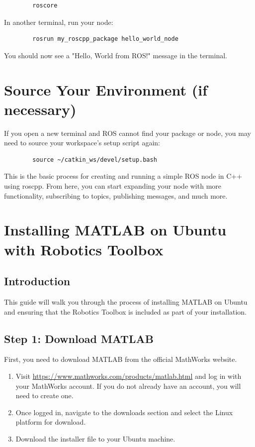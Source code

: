\documentclass[12pt,a4paper]{article}
\begin{document}
	\begin{verbatim}
		roscore
	\end{verbatim}
	In another terminal, run your node:
	
	\begin{verbatim}
		rosrun my_roscpp_package hello_world_node
	\end{verbatim}
	You should now see a "Hello, World from ROS!" message in the terminal.
	
	\section{Source Your Environment (if necessary)}
	If you open a new terminal and ROS cannot find your package or node, you may need to source your workspace's setup script again:
	
	\begin{verbatim}
		source ~/catkin_ws/devel/setup.bash
	\end{verbatim}
	This is the basic process for creating and running a simple ROS node in C++ using roscpp. From here, you can start expanding your node with more functionality, subscribing to topics, publishing messages, and much more.
	
	\section{Installing MATLAB on Ubuntu with Robotics Toolbox}
	\subsection{Introduction}
	This guide will walk you through the process of installing MATLAB on Ubuntu and ensuring that the Robotics Toolbox is included as part of your installation.
	
	\subsection{Step 1: Download MATLAB}
	First, you need to download MATLAB from the official MathWorks website.
	\begin{enumerate}
		\item Visit \url{https://www.mathworks.com/products/matlab.html} and log in with your MathWorks account. If you do not already have an account, you will need to create one.
		\item Once logged in, navigate to the downloads section and select the Linux platform for download.
		\item Download the installer file to your Ubuntu machine.
	\end{enumerate}
	
\end{document}
